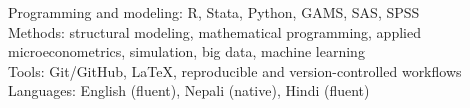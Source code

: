 Programming and modeling: R, Stata, Python, GAMS, SAS, SPSS\\
Methods: structural modeling, mathematical programming, applied microeconometrics, simulation, big data, machine learning\\
Tools: Git/GitHub, LaTeX, reproducible and version-controlled workflows\\
Languages: English (fluent), Nepali (native), Hindi (fluent)